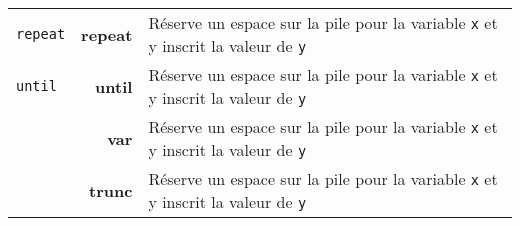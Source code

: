 \documentclass{article}
\begin{document}
\begin{longtable}{p{1.3cm} r p{12cm}}
  {\lstset{style=lua}\lstinline$repeat$} & \textbf{repeat} & Réserve un espace sur la pile pour la variable \texttt{x} et y inscrit la valeur de \texttt{y}\\
  {\lstset{style=lua}\lstinline$until$} & \textbf{until} & Réserve un espace sur la pile pour la variable \texttt{x} et y inscrit la valeur de \texttt{y}\\
  {\lstset{style=lua}\lstinline$$} & \textbf{var} & Réserve un espace sur la pile pour la variable \texttt{x} et y inscrit la valeur de \texttt{y}\\
  {\lstset{style=lua}\lstinline$$} & \textbf{trunc} & Réserve un espace sur la pile pour la variable \texttt{x} et y inscrit la valeur de \texttt{y}\\
  
  
\end{longtable}
\end{document}

